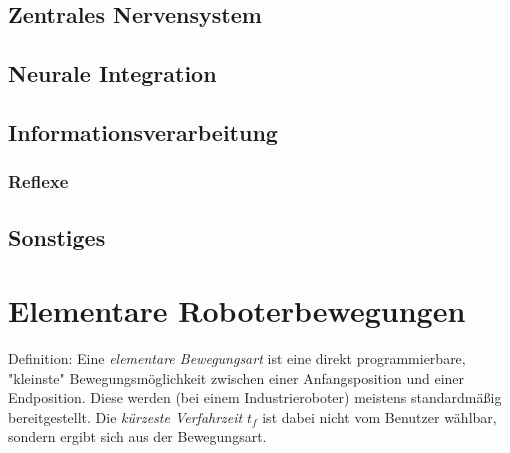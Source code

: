 		\subsection{Zentrales Nervensystem} %

		\subsection{Neurale Integration} %

		\subsection{Informationsverarbeitung} %

			\subsubsection{Reflexe} %

		\subsection{Sonstiges} %

	\section{Elementare Roboterbewegungen}
		Definition: Eine \emph{elementare Bewegungsart} ist eine direkt programmierbare, "kleinste" Bewegungsmöglichkeit zwischen einer Anfangsposition und einer Endposition. Diese werden (bei einem Industrieroboter) meistens standardmäßig bereitgestellt. Die \emph{kürzeste Verfahrzeit} \(t_f\) ist dabei \iA nicht vom Benutzer wählbar, sondern ergibt sich aus der Bewegungsart.

